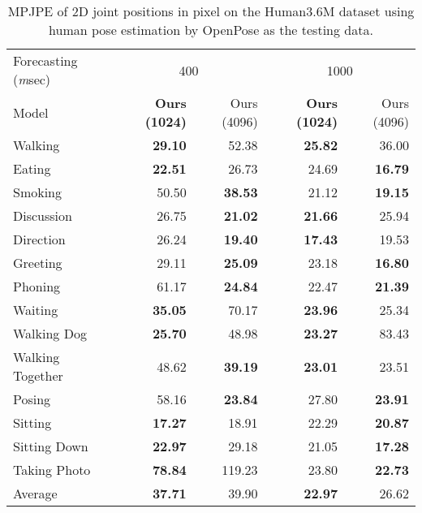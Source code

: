 \begin{table}
    \centering
    \caption{MPJPE of 2D joint positions in pixel on the Human3.6M dataset using human pose estimation by OpenPose as the testing data.}
    \begin{tabular}{l|rr|rr}
    
        \toprule
        Forecasting ({\textit msec})  & \multicolumn{2}{c|}{400}                        & \multicolumn{2}{c}{1000} \\
         Model    & \textbf{Ours (1024)}  &  Ours (4096) & \textbf{Ours (1024)}  &  Ours (4096)\\

        \midrule
        Walking	 & \textbf{29.10} & 52.38  & \textbf{25.82} & 36.00\\
        Eating & \textbf{22.51} & 26.73 & 24.69  & \textbf{16.79}\\
        Smoking & 50.50 & \textbf{38.53} & 21.12  & \textbf{19.15}\\
        Discussion & 26.75 & \textbf{21.02} & \textbf{21.66}  & 25.94\\
        Direction & 26.24 & \textbf{19.40} & \textbf{17.43} & 19.53\\
        Greeting & 29.11 & \textbf{25.09}  & 23.18 & \textbf{16.80}\\
        Phoning & 61.17 & \textbf{24.84} & 22.47 & \textbf{21.39}\\
        Waiting & \textbf{35.05} & 70.17 & \textbf{23.96} & 25.34\\
        Walking Dog & \textbf{25.70} & 48.98 & \textbf{23.27} & 83.43\\
        Walking Together & 48.62 & \textbf{39.19} & \textbf{23.01} & 23.51\\
        Posing & 58.16 & \textbf{23.84} & 27.80 & \textbf{23.91}\\
        Sitting & \textbf{17.27} & 18.91 & 22.29 & \textbf{20.87}\\
        Sitting Down & \textbf{22.97} & 29.18 & 21.05 & \textbf{17.28}\\
        Taking Photo & \textbf{78.84} & 119.23 & 23.80 & \textbf{22.73}\\
        \midrule
        Average  &  \textbf{37.71} &  39.90 & \textbf{22.97} &  26.62\\
        \bottomrule
    \end{tabular}
    \label{tbl:MPJPE_openpose}
\end{table}


